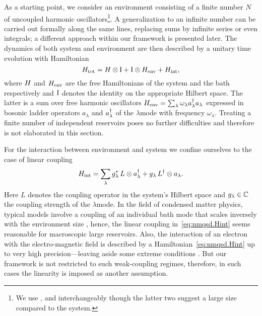 As a starting point, we consider an environment consisting of a finite number $N$ of uncoupled harmonic oscillators\footnote{%
  We use ,  and  interchangeably though the latter two suggest a large size compared to the system.
}.
A generalization to an infinite number can be carried out formally along the same lines, replacing sums by infinite series or even integrals; a different approach within our framework is presented later.
The dynamics of both system and environment are then described by a unitary time evolution with Hamiltonian
\begin{equation}
  H_\mathrm{tot} = H \otimes \mathrm{I}  +  \mathrm{I} \otimes H_\mathrm{env}  +  H_\mathrm{int},
  \label{eq:nmqsd.Htot_schr}
\end{equation}
where $H$ and $H_\mathrm{env}$ are the free Hamiltonians of the system and the bath respectively and $\mathrm{I}$ denotes the identity on the appropriate Hilbert space.
The latter is a sum over free harmonic oscillators $H_\mathrm{env} = \sum_\lambda \omega_\lambda a^\dagger_\lambda a_\lambda$ expressed in bosonic ladder operators $a_\lambda$ and $a^\dagger_\lambda$ of the $\lambda$\th mode with frequency $\omega_\lambda$.
Treating a finite number of independent reservoirs poses no further difficulties and therefore is not elaborated in this section.

For the interaction between environment and system we confine ourselves to the case of linear coupling
\begin{equation}
  H_\mathrm{int} = \sum_\lambda {g}^*_\lambda \, L \otimes a^\dagger_\lambda + g_\lambda \, L^\dagger \otimes a_\lambda.
  \label{eq:nmqsd.Hint}
\end{equation}
Here $L$ denotes the coupling operator in the system's Hilbert space and $g_\lambda \in \mathbb{C}$ the coupling strength of the $\lambda$\th mode.
In the field of condensed matter physics, typical models involve a coupling of an individual bath mode that scales inversely with the environment size \cite{We99_dissipative_systems}, hence, the linear coupling in~\ref{eq:nmqsd.Hint} seems reasonable for macroscopic large reservoirs.
Also, the interaction of an electron with the electro-magnetic field is described by a Hamiltonian~\ref{eq:nmqsd.Hint} up to very high precision---leaving aside some extreme conditions \cite{WaMi08_quantum_optics}.
But our framework is not restricted to such weak-coupling regimes, therefore, in such cases the linearity is imposed as another assumption.

